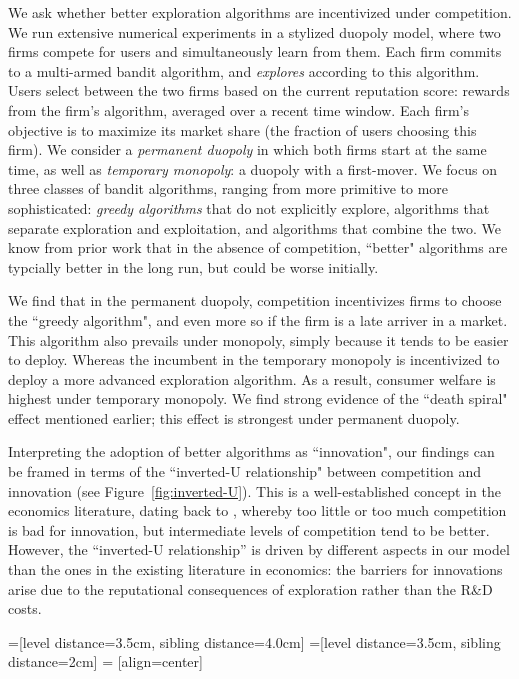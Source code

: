 \documentclass[acmsmall]{ec19acm}
\theoremstyle{definition}
\newcommand{\xhdr}[1]{\vspace{1mm} \noindent{\bf #1}}
\begin{document}
We ask whether better exploration algorithms are incentivized under competition.  We run extensive numerical experiments in a stylized duopoly model, where two firms compete for users and simultaneously learn from them. Each firm commits to a multi-armed bandit algorithm, and \emph{explores} according to this algorithm. Users select between the two firms based on the current reputation score: rewards from the firm's algorithm, averaged over a recent time window. Each firm's objective is to maximize its market share (the fraction of users choosing this firm). We consider a \emph{permanent duopoly} in which both firms start at the same time, as well as \emph{temporary monopoly}: a duopoly with a first-mover. We focus on three classes of bandit algorithms, ranging from more primitive to more sophisticated: \emph{greedy algorithms} that do not explicitly explore, algorithms that separate exploration and exploitation, and algorithms that combine the two. We know from prior work that in the absence of competition,  ``better" algorithms are typcially better in the long run, but could be worse initially.

\xhdr{Main findings.}
We find that in the permanent duopoly, competition incentivizes firms to choose the ``greedy algorithm", and even more so if the firm is a late arriver in a market. This algorithm also prevails under monopoly, simply because it tends to be easier to deploy. Whereas the incumbent in the temporary monopoly is incentivized to deploy a more advanced exploration algorithm. As a result, consumer welfare is highest under temporary monopoly. We find strong evidence of the ``death spiral" effect mentioned earlier; this effect is strongest under permanent duopoly.

Interpreting the adoption of better algorithms as ``innovation", our findings can be framed in terms of the ``inverted-U relationship" between competition and innovation (see Figure~\ref{fig:inverted-U}). This is a well-established concept in the economics literature, dating back to \cite{Schumpeter-42}, whereby too little or too much competition is bad for innovation, but intermediate levels of competition tend to be better. However, the ``inverted-U relationship'' is driven by different aspects in our model than the ones in the existing literature in economics:  the barriers for innovations arise due to the reputational consequences of exploration rather than the R\&D costs.


=[level distance=3.5cm, sibling distance=4.0cm]
=[level distance=3.5cm, sibling distance=2cm]
 = [align=center]
\end{document}
